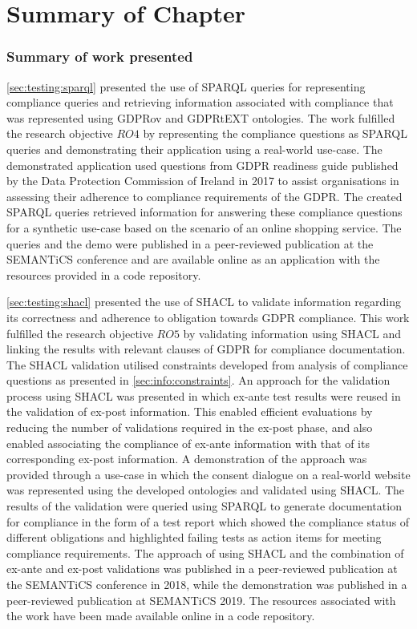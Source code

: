 \section{Summary of Chapter}\label{sec:testing:conclusion}

\subsubsection*{Summary of work presented}
\autoref{sec:testing:sparql} presented the use of SPARQL queries for representing compliance queries and retrieving information associated with compliance that was represented using GDPRov and GDPRtEXT ontologies.
The work fulfilled the research objective $RO4$ by representing the compliance questions as SPARQL queries and demonstrating their application using a real-world use-case.
The demonstrated application used questions from GDPR readiness guide published by the Data Protection Commission of Ireland in 2017 to assist organisations in assessing their adherence to compliance requirements of the GDPR.
The created SPARQL queries retrieved information for answering these compliance questions for a synthetic use-case based on the scenario of an online shopping service.
The queries and the demo were published in a peer-reviewed publication \cite{pandit_queryable_2018} at the SEMANTiCS conference and are available online as an application with the resources provided in a code repository.

\autoref{sec:testing:shacl} presented the use of SHACL to validate information regarding its correctness and adherence to obligation towards GDPR compliance.
This work fulfilled the research objective $RO5$ by validating information using SHACL and linking the results with relevant clauses of GDPR for compliance documentation.
The SHACL validation utilised constraints developed from analysis of compliance questions as presented in \autoref{sec:info:constraints}.
An approach for the validation process using SHACL was presented in which ex-ante test results were reused in the validation of ex-post information. This enabled efficient evaluations by reducing the number of validations required in the ex-post phase, and also enabled associating the compliance of ex-ante information with that of its corresponding ex-post information.
A demonstration of the approach was provided through a use-case in which the consent dialogue on a real-world website was represented using the developed ontologies and validated using SHACL.
The results of the validation were queried using SPARQL to generate documentation for compliance in the form of a test report which showed the compliance status of different obligations and highlighted failing tests as action items for meeting compliance requirements.
The approach of using SHACL and the combination of ex-ante and ex-post validations was published in a peer-reviewed publication \cite{pandit_towards_2018} at the SEMANTiCS conference in 2018, while the demonstration was published in a peer-reviewed publication \cite{pandit_test-driven_2019} at SEMANTiCS 2019.
The resources associated with the work have been made available online in a code repository.

